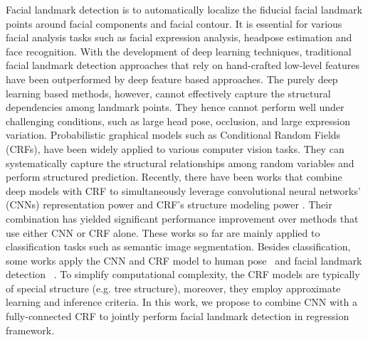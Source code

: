 \documentclass{article}
\begin{document}
  Facial landmark detection is to automatically localize the fiducial facial landmark points around facial components and facial contour. It is essential for various facial analysis tasks such as facial expression analysis, headpose estimation and face recognition. With the development of deep learning techniques, traditional facial landmark detection approaches that rely on hand-crafted low-level features have been outperformed by deep feature based approaches.
  The purely deep learning based methods, however, cannot effectively capture the structural dependencies among landmark points. They hence cannot perform well under challenging conditions, such as large head pose, occlusion, and large expression variation. Probabilistic graphical models such as Conditional Random Fields (CRFs), have been widely applied to various computer vision tasks. They can systematically capture the structural relationships among random variables and perform structured prediction. Recently, there have been works that combine deep models with CRF to simultaneously leverage convolutional neural networks' (CNNs) representation power and CRF's structure modeling power \cite{Chen2014pose-CRF-segmentation,Chen2018DeepLab,Zheng2015CRFasRNN}. Their combination has yielded significant performance improvement over methods that use either CNN or CRF alone. These works so far are mainly applied to classification tasks such as semantic image segmentation. Besides classification, some works apply the CNN and CRF model to human pose~\cite{Tompson14heatmapPose,chu2016structure-cnn-pose,chu2016hidden-crf-cnn-pose} and facial landmark detection~\cite{Tadas2014CLNF,wayne2018LAB} . To simplify computational complexity, the CRF models are typically of special structure (e.g. tree structure), moreover, they employ approximate learning and inference criteria. In this work, we propose to combine CNN with a fully-connected CRF to jointly perform facial landmark detection in regression framework.
  
\end{document}
